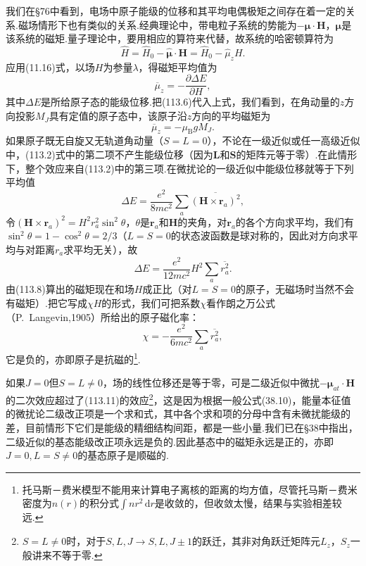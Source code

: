 我们在§76中看到，电场中原子能级的位移和其平均电偶极矩之间存在着一定的关系.磁场情形下也有类似的关系.经典理论中，带电粒子系统的势能为$-\boldsymbol{\mu}\cdot\boldsymbol{H}$，$\boldsymbol{\mu}$是该系统的磁矩.量子理论中，要用相应的算符来代替，故系统的哈密顿算符为
\begin{equation*}
  \hat{H}=\hat{H}_0-\hat{\boldsymbol{\mu}}\cdot\boldsymbol{H}
  =\hat{H}_0-\hat{\mu}_zH.
\end{equation*}
应用(11.16)式，以场$H$为参量$\lambda$，得磁矩平均值为
\begin{equation}
  \overline{\mu}_z=-\frac{\partial\Delta E}{\partial H},
\end{equation}
其中$\Delta E$是所给原子态的能级位移.把(113.6)代入上式，我们看到，在角动量的$z$方向投影$M_J$具有定值的原子态中，该原子沿$z$方向的平均磁矩为
\begin{equation}
  \overline{\mu}_z=-\mu_\mathrm{B}gM_J.
\end{equation}
如果原子既无自旋又无轨道角动量（$S=L=0$），不论在一级近似或任一高级近似中，(113.2)式中的第二项不产生能级位移（因为$\boldsymbol{L}$和$\boldsymbol{S}$的矩阵元等于零）.在此情形下，整个效应来自(113.2)中的第三项.在微扰论的一级近似中能级位移就等于下列平均值
\begin{equation}
  \Delta E=\frac{e^2}{8mc^2}\sum_a\overline{(\boldsymbol{H}\times\boldsymbol{r}_a)^2},
\end{equation}
令$(\boldsymbol{H}\times\boldsymbol{r}_a)^2=H^2r_a^2\sin^2\theta$，$\theta$是$\boldsymbol{r}_a$和$\boldsymbol{H}$的夹角，对$\boldsymbol{r}_a$的各个方向求平均，我们有$\sin^2\theta=1-\cos^2\theta=2/3$（$L=S=0$的状态波函数是球对称的，因此对方向求平均与对距离$r_a$求平均无关），故
\begin{equation}
  \Delta E=\frac{e^2}{12mc^2}H^2\sum_a\overline{r_a^2}.
\end{equation}
由(113.8)算出的磁矩现在和场$H$成正比（对$L=S=0$的原子，无磁场时当然不会有磁矩）.把它写成$\chi H$的形式，我们可把系数$\chi$看作朗之万公式（P.~Langevin,1905）所给出的原子磁化率：
\begin{equation}
  \chi=-\frac{e^2}{6mc^2}\sum_a\overline{r_a^2},
\end{equation}
它是负的，亦即原子是抗磁的\footnote{托马斯－费米模型不能用来计算电子离核的距离的均方值，尽管托马斯－费米密度为$n(r)$的积分式$\int nr^2\,\mathrm{d}r$是收敛的，但收敛太慢，结果与实验相差较远.}.

如果$J=0$但$S=L\neq0$，场的线性位移还是等于零，可是二级近似中微扰$-\boldsymbol{\mu}_{at}\cdot\boldsymbol{H}$的二次效应超过了(113.11)的效应\footnote{$S=L\neq0$时，对于$S,L,J\rightarrow S,L,J\pm1$的跃迁，其非对角跃迁矩阵元$L_z$，$S_z$一般讲来不等于零.}，这是因为根据一般公式(38.10)，能量本征值的微扰论二级改正项是一个求和式，其中各个求和项的分母中含有未微扰能级的差，目前情形下它们是能级的精细结构间距，都是一些小量.我们已在§38中指出，二级近似的基态能级改正项永远是负的.因此基态中的磁矩永远是正的，亦即$J=0,L=S\neq0$的基态原子是顺磁的.

